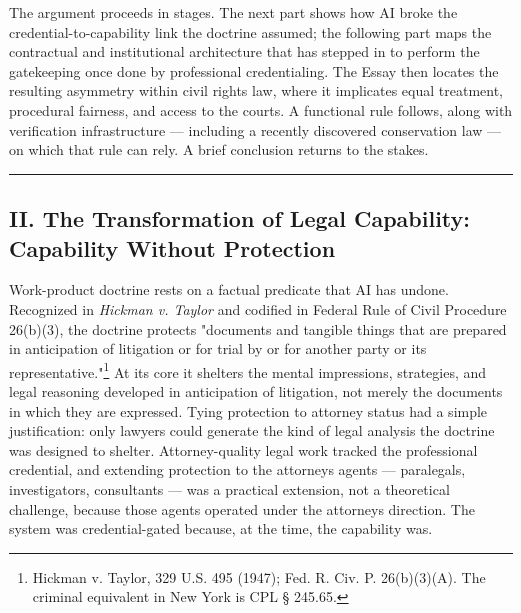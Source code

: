 \documentclass[
  12pt,
]{article}
\begin{document}
The argument proceeds in stages. The next part shows how AI broke the
credential-to-capability link the doctrine assumed; the following part
maps the contractual and institutional architecture that has stepped in
to perform the gatekeeping once done by professional credentialing. The
Essay then locates the resulting asymmetry within civil rights law,
where it implicates equal treatment, procedural fairness, and access to
the courts. A functional rule follows, along with verification
infrastructure --- including a recently discovered conservation law ---
on which that rule can rely. A brief conclusion returns to the stakes.

\begin{center}\rule{0.5\linewidth}{0.5pt}\end{center}

\subsection{II. The Transformation of Legal Capability: Capability
Without
Protection}\label{ii-the-transformation-of-legal-capability-capability-without-protection}

Work-product doctrine rests on a factual predicate that AI has undone.
Recognized in \emph{Hickman v. Taylor} and codified in Federal Rule of
Civil Procedure 26(b)(3), the doctrine protects
"documents and tangible things that are prepared in anticipation of
litigation or for trial by or for another party or its
representative."\footnote{Hickman v. Taylor, 329 U.S. 495 (1947); Fed.
  R. Civ. P. 26(b)(3)(A). The criminal equivalent in New York is CPL §
  245.65.} At its core it shelters the mental impressions, strategies,
and legal reasoning developed in anticipation of litigation, not merely
the documents in which they are expressed. Tying protection to attorney
status had a simple justification: only lawyers could generate the kind
of legal analysis the doctrine was designed to shelter. Attorney-quality
legal work tracked the professional credential, and extending protection
to the attorney\textquotesingle s agents --- paralegals, investigators,
consultants --- was a practical extension, not a theoretical challenge,
because those agents operated under the attorney\textquotesingle s
direction. The system was credential-gated because, at the time, the
capability was.
\end{document}
